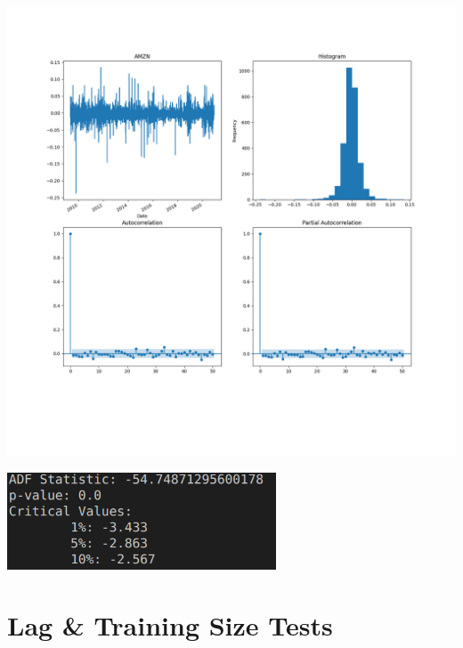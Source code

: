 \documentclass{article}
\begin{document}
\includegraphics[width=\textwidth]{../output/AMZN_trans_summary.png}

\includegraphics[width=0.6\textwidth]{../output/post-adf.png}

\section*{Lag \& Training Size Tests}
\end{document}
